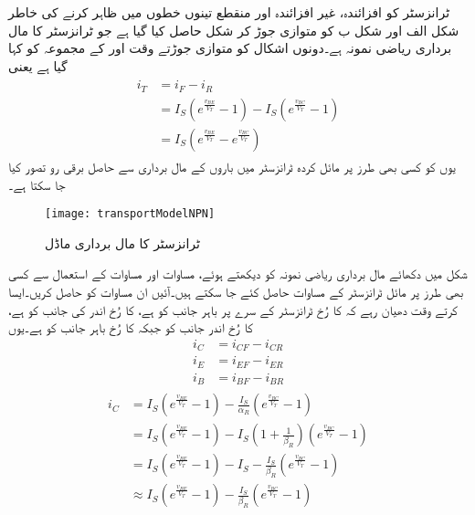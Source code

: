 ٹرانزسٹر کو افزائندہ، غیر افزائندہ اور منقطع تینوں خطوں میں ظاہر کرنے کی خاطر شکل  الف اور شکل  ب  کو متوازی جوڑ کر شکل   حاصل کیا گیا ہے جو  ٹرانزسٹر کا مال برداری ریاضی نمونہ ہے۔دونوں اشکال کو متوازی جوڑتے وقت   اور   کے مجموعہ کو  کہا گیا ہے یعنی
\begin{gather}
\begin{aligned}
i_T &=i_F-i_R\\
&=I_S \left (e^{\frac{v_{BE}}{V_T}}-1 \right ) -I_S \left (e^{\frac{v_{BC}}{V_T}}-1 \right )\\
&=I_S \left (e^{\frac{v_{BE}}{V_T}}-e^{\frac{v_{
BC}}{V_T}} \right )
\end{aligned}
\end{gather}
یوں  کو کسی بھی طرز پر مائل کردہ ٹرانزسٹر میں باروں کے مال برداری سے حاصل برقی رو تصور کیا جا سکتا ہے۔
\begin{figure}
\centering
\texttt{[image: transportModelNPN]}
\caption{ ٹرانزسٹر کا مال برداری ماڈل}
\label{شکل_مال_برداری_ماڈل}
\end{figure}
شکل   میں دکھائے مال برداری ریاضی نمونہ کو دیکھتے ہوئے، مساوات  اور مساوات  کے استعمال سے کسی بھی طرز پر مائل ٹرانزسٹر کے مساوات حاصل کئے جا سکتے ہیں۔آئیں ان مساوات کو حاصل کریں۔ایسا کرتے وقت دھیان رہے کہ  کا رُخ ٹرانزسٹر کے سرے پر باہر جانب کو ہے،   کا رُخ اندر کی جانب کو ہے،   کا رُخ اندر جانب کو  جبکہ   کا رُخ باہر جانب کو ہے۔یوں
\begin{align}
i_C&=i_{CF}-i_{CR}\\
i_E&=i_{EF}-i_{ER}\\
i_B&=i_{BF}-i_{BR}
\end{align}
%
\begin{gather} \label{مساوات_ٹرانزسٹر_چارجوں_کی_مال_برداری_اور_کلکٹر _رو}
\begin{aligned}
i_C&=I_S \left (e^{\frac{v_{BE}}{V_T}}-1 \right )-\frac{I_S}{\alpha_R} \left(e^{\frac{v_{BC}}{V_T}}-1 \right )\\
&=I_S \left (e^{\frac{v_{BE}}{V_T}}-1 \right ) -I_S \left (1+\frac{1}{\beta_R} \right ) \left (e^{\frac{v_{BC}}{V_T}}-1 \right )\\
&=I_S \left (e^{\frac{v_{BE}}{V_T}}-1 \right ) - I_S -\frac{I_S}{\beta_R} \left (e^{\frac{v_{BC}}{V_T}}-1 \right ) \\
&\approx  I_S \left (e^{\frac{v_{BE}}{V_T}}-1 \right )  -\frac{I_S}{\beta_R} \left (e^{\frac{v_{BC}}{V_T}}-1 \right )
\end{aligned}
\end{gather}
